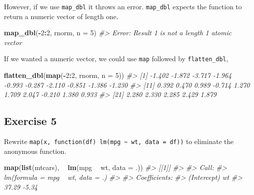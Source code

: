 \documentclass[]{book}
\newenvironment{Shaded}{\begin{snugshade}}{\end{snugshade}}
\newcommand{\CommentTok}[1]{\textcolor[rgb]{0.56,0.35,0.01}{\textit{#1}}}
\newcommand{\DataTypeTok}[1]{\textcolor[rgb]{0.13,0.29,0.53}{#1}}
\newcommand{\DecValTok}[1]{\textcolor[rgb]{0.00,0.00,0.81}{#1}}
\newcommand{\KeywordTok}[1]{\textcolor[rgb]{0.13,0.29,0.53}{\textbf{#1}}}
\newcommand{\NormalTok}[1]{#1}
\newcommand{\OperatorTok}[1]{\textcolor[rgb]{0.81,0.36,0.00}{\textbf{#1}}}
\newcommand{\StringTok}[1]{\textcolor[rgb]{0.31,0.60,0.02}{#1}}
\theoremstyle{definition}
\theoremstyle{definition}
\theoremstyle{definition}
\theoremstyle{remark}
\begin{document}
However, if we use \texttt{map\_dbl} it throws an error.
\texttt{map\_dbl} expects the function to return a numeric vector of
length one.

\begin{Shaded}
\begin{Highlighting}[]
\KeywordTok{map_dbl}\NormalTok{(}\OperatorTok{-}\DecValTok{2}\OperatorTok{:}\DecValTok{2}\NormalTok{, rnorm, }\DataTypeTok{n =} \DecValTok{5}\NormalTok{)}
\CommentTok{#> Error: Result 1 is not a length 1 atomic vector}
\end{Highlighting}
\end{Shaded}

If we wanted a numeric vector, we could use \texttt{map} followed by
\texttt{flatten\_dbl},

\begin{Shaded}
\begin{Highlighting}[]
\KeywordTok{flatten_dbl}\NormalTok{(}\KeywordTok{map}\NormalTok{(}\OperatorTok{-}\DecValTok{2}\OperatorTok{:}\DecValTok{2}\NormalTok{, rnorm, }\DataTypeTok{n =} \DecValTok{5}\NormalTok{))}
\CommentTok{#>  [1] -1.402 -1.872 -3.717 -1.964 -0.993 -0.287 -2.110 -0.851 -1.386 -1.230}
\CommentTok{#> [11]  0.392  0.470  0.989 -0.714  1.270  1.709  2.047 -0.210  1.380  0.933}
\CommentTok{#> [21]  2.280  2.330  2.285  2.429  1.879}
\end{Highlighting}
\end{Shaded}

\hypertarget{exercise-5-16}{%
\subsection{Exercise 5}\label{exercise-5-16}}

Rewrite
\texttt{map(x,\ function(df)\ lm(mpg\ \textasciitilde{}\ wt,\ data\ =\ df))}
to eliminate the anonymous function.

\begin{Shaded}
\begin{Highlighting}[]
\KeywordTok{map}\NormalTok{(}\KeywordTok{list}\NormalTok{(mtcars), }\OperatorTok{~}\StringTok{ }\KeywordTok{lm}\NormalTok{(mpg }\OperatorTok{~}\StringTok{ }\NormalTok{wt, }\DataTypeTok{data =}\NormalTok{ .))}
\CommentTok{#> [[1]]}
\CommentTok{#> }
\CommentTok{#> Call:}
\CommentTok{#> lm(formula = mpg ~ wt, data = .)}
\CommentTok{#> }
\CommentTok{#> Coefficients:}
\CommentTok{#> (Intercept)           wt  }
\CommentTok{#>       37.29        -5.34}
\end{Highlighting}
\end{Shaded}
\end{document}
